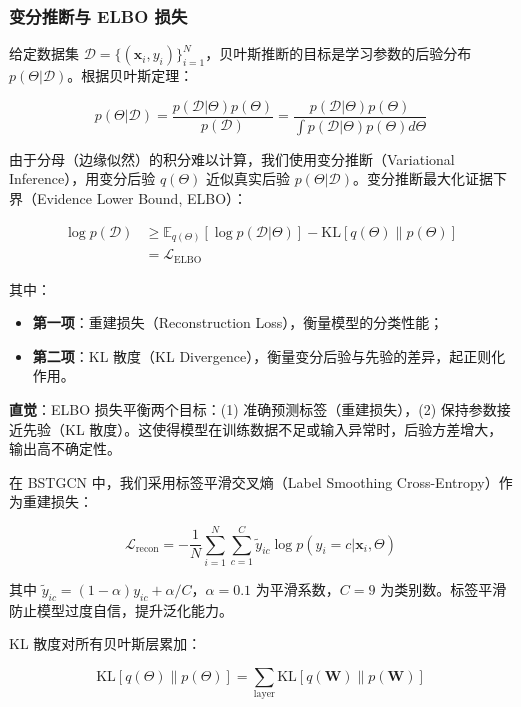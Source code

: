 \subsubsection{变分推断与 ELBO 损失}

给定数据集 $\mathcal{D} = \{(\mathbf{x}_i, y_i)\}_{i=1}^N$，贝叶斯推断的目标是学习参数的后验分布 $p(\Theta | \mathcal{D})$。根据贝叶斯定理：

\begin{equation}
p(\Theta | \mathcal{D}) = \frac{p(\mathcal{D} | \Theta) p(\Theta)}{p(\mathcal{D})} = \frac{p(\mathcal{D} | \Theta) p(\Theta)}{\int p(\mathcal{D} | \Theta) p(\Theta) d\Theta}
\end{equation}

由于分母（边缘似然）的积分难以计算，我们使用变分推断（Variational Inference），用变分后验 $q(\Theta)$ 近似真实后验 $p(\Theta | \mathcal{D})$。变分推断最大化证据下界（Evidence Lower Bound, ELBO）：

\begin{align}
\log p(\mathcal{D}) &\geq \mathbb{E}_{q(\Theta)}[\log p(\mathcal{D} | \Theta)] - \text{KL}[q(\Theta) \| p(\Theta)] \\
&= \mathcal{L}_{\text{ELBO}}
\end{align}

其中：
\begin{itemize}
  \item \textbf{第一项}：重建损失（Reconstruction Loss），衡量模型的分类性能；
  \item \textbf{第二项}：KL 散度（KL Divergence），衡量变分后验与先验的差异，起正则化作用。
\end{itemize}

\textbf{直觉}：ELBO 损失平衡两个目标：(1) 准确预测标签（重建损失），(2) 保持参数接近先验（KL 散度）。这使得模型在训练数据不足或输入异常时，后验方差增大，输出高不确定性。

在 BSTGCN 中，我们采用标签平滑交叉熵（Label Smoothing Cross-Entropy）作为重建损失：

\begin{equation}
\mathcal{L}_{\text{recon}} = -\frac{1}{N} \sum_{i=1}^N \sum_{c=1}^C \tilde{y}_{ic} \log p(y_i=c | \mathbf{x}_i, \Theta)
\end{equation}

其中 $\tilde{y}_{ic} = (1-\alpha) y_{ic} + \alpha / C$，$\alpha=0.1$ 为平滑系数，$C=9$ 为类别数。标签平滑防止模型过度自信，提升泛化能力。

KL 散度对所有贝叶斯层累加：

\begin{equation}
\text{KL}[q(\Theta) \| p(\Theta)] = \sum_{\text{layer}} \text{KL}[q(\mathbf{W}) \| p(\mathbf{W})]
\end{equation}

